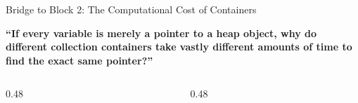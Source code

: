 \begin{frame}{Bridge to Block 2: The Computational Cost of Containers}
  \begin{center}
    \vspace{0.15cm}
    \begin{tcolorbox}[enhanced,arc=2mm,boxrule=.6pt,colback=UpGradNight,colframe=AWSSquid,
      left=6mm,right=6mm,top=4mm,bottom=4mm,width=0.92\linewidth]
      {\UpGradDisplayFont\fontsize{12}{16}\selectfont\bfseries\color{white}
        “If every variable is merely a pointer to a heap object, why do different collection containers take vastly different amounts of time to find the exact same pointer?”
      }
    \end{tcolorbox}
  \end{center}
  \vfill
  \begin{columns}[c,onlytextwidth]
    \begin{column}{0.48\textwidth}
    \end{column}
    \begin{column}{0.48\textwidth}
    \end{column}
  \end{columns}
\end{frame}
